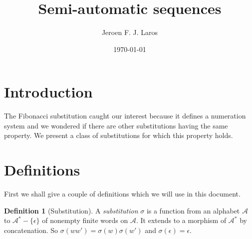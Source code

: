 \documentclass{article}
\title{\Huge{Semi-automatic sequences}}
\author{Jeroen F. J. Laros}
\date{\today}
\theoremstyle{definition}
\newtheorem{definition}[theorem]{Definition}
\begin{document}
\maketitle
\newpage

\tableofcontents
\newpage

\section{Introduction}
The Fibonacci substitution caught our interest because it defines a numeration
system and we wondered if there are other substitutions having the same 
property. We present a class of substitutions for which this property holds.

\section{Definitions}
First we shall give a couple of definitions which we will use in this document.

\begin{definition}[Substitution] \label{def:substitution}
A \emph{substitution} $\sigma$ is a function from an alphabet $\mathcal{A}$ to 
$\mathcal{A}^* - \{\epsilon\}$ of nonempty finite words on $\mathcal{A}$. It
extends to a morphism of $\mathcal{A}^*$ by concatenation. So 
$\sigma(w w') = \sigma(w) \sigma(w')$ and $\sigma(\epsilon) = \epsilon$.
\end{definition}
\end{document}
